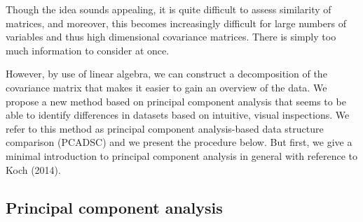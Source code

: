 \documentclass[titlepage,11pt,twoside]{article}
\begin{document}
Though the idea sounds appealing, it is quite difficult to assess similarity of matrices, and moreover, this becomes increasingly difficult for large numbers of variables and thus high dimensional covariance matrices. There is simply too much information to consider at once.

However, by 
use of linear algebra, we can construct a decomposition of the covariance matrix that makes it easier to gain an overview of the data. We propose a new method based on principal component analysis that seems to be able to identify differences in datasets based on intuitive, visual inspections. We refer to this method as principal component analysis-based data structure comparison (PCADSC) and we present the procedure below. But first, we give a minimal introduction to principal component analysis in general with reference to Koch (2014).


\subsection{Principal component analysis}
\end{document}

